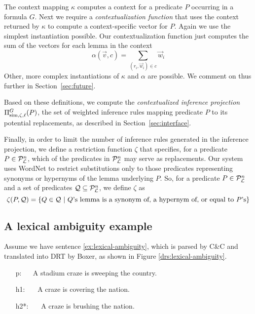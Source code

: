 The context mapping $\kappa$ computes a context for a predicate $P$
occurring in a formula $G$. Next we require a 
\textit{contextualization function} that uses the context returned by
$\kappa$ to compute a context-specific vector for $P$. Again we use
the simplest instantiation possible. Our contextualization
function just computes the sum of the vectors for each lemma in the context \[ \alpha(\vec v,
c) = \sum_{(r_i, \vec w_i) \in c} \vec w_i \]  Other, more complex
instantiations of $\kappa$ and $\alpha$ are possible. We comment on
thus further in Section~\ref{sec:future}. 

Based on these definitions, we compute the \textit{contextualized
inference projection} $\Pi^G_{\mathrm{sim},\zeta,\ell}(P)$, the set of weighted
inference rules mapping predicate $P$ to its potential replacements,
as described in Section~\ref{sec:interface}.

Finally, in order to limit the number of inference rules generated in the
inference projection, we define a restriction function $\zeta$ that specifies,
for a predicate $P \in {\cal{P}}_{{\cal{L}}}^n$, which of the predicates in
${\cal{P}}_{{\cal{L}}}^n$ may serve as replacements.  Our system uses WordNet
\citep{miller:wordnet2009} to restrict substitutions only to those predicates
representing synonyms or hypernyms of the lemma underlying $P$.  So, for a
predicate $P \in {\cal{P}}_{{\cal{L}}}^n$ and a set of predicates ${\cal Q}
\subseteq {\cal{P}}_{{\cal{L}}}^n$, we define $\zeta$ as \[ \zeta(P,{\cal Q}) = \{
Q \in {\cal Q} ~|~ Q\text{'s lemma is a synonym of, a hypernym of, or equal to
}P\text{'s} \} \]


\subsection*{A lexical ambiguity example}

Assume we have sentence \eqref{ex:lexical-ambiguity}, which is parsed by C\&C
and translated into DRT by Boxer, as shown in Figure
\ref{drs:lexical-ambiguity}.

\begin{covex}\label{ex:lexical-ambiguity}
\begin{itemize} \itemsep -3pt
  \item[p:]~~  A stadium craze is sweeping the country.
  \item[h1:]~~~A craze is covering the nation.
  \item[h2*:]~~~A craze is brushing the nation.
\end{itemize}
\end{covex}

